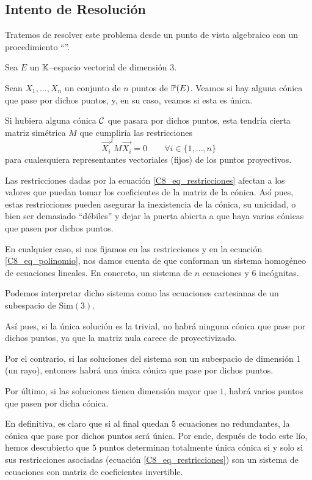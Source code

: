 \subsection{Intento de Resolución}
\label{C8_intento}
Tratemos de resolver este problema desde un punto de vista algebraico con un procedimiento ``''.

Sea $E$ un $\mathbb{K}$--espacio vectorial de dimensión $3$.

Sean $X_1,\dots,X_n$ un conjunto de $n$ puntos de $\mathbb{P}(E)$. Veamos si hay alguna cónica que pase por dichos puntos, y, en su caso, veamos si esta es única.

Si hubiera alguna cónica $\mathcal{C}$ que pasara por dichos puntos, esta tendría cierta matriz simétrica $M$ que cumpliría las restricciones
\begin{equation}
\label{C8_eq_restricciones}
	\vec{X_i}^tM\vec{X_i}=0\qquad\forall i\in\{1,\dots,n\}
\end{equation}
para cualesquiera representantes vectoriales (fijos) de los puntos proyectivos.

Las restricciones dadas por la ecuación \eqref{C8_eq_restricciones} afectan a los valores que puedan tomar los coeficientes de la matriz de la cónica. Así pues, estas restricciones pueden asegurar la inexistencia de la cónica, su unicidad, o bien ser demasiado ``débiles'' y dejar la puerta abierta a que haya varias cónicas que pasen por dichos puntos.

En cualquier caso, si nos fijamos en las restricciones y en la ecuación \eqref{C8_eq_polinomio}, nos damos cuenta de que conforman un sistema homogéneo de ecuaciones lineales. En concreto, un sistema de $n$ ecuaciones y $6$ incógnitas.

Podemos interpretar dicho sistema como las ecuaciones cartesianas de un subespacio de $\mathrm{Sim}(3)$.

Así pues, si la única solución es la trivial, no habrá ninguna cónica que pase por dichos puntos, ya que la matriz nula carece de proyectivizado.

Por el contrario, si las soluciones del sistema son un subespacio de dimensión $1$ (un rayo), entonces habrá una única cónica que pase por dichos puntos.

Por último, si las soluciones tienen dimensión mayor que $1$, habrá varios puntos que pasen por dicha cónica.

En definitiva, es claro que si al final quedan $5$ ecuaciones no redundantes, la cónica que pase por dichos puntos será única. Por ende, después de todo este lío, hemos descubierto que $5$ puntos determinan totalmente única cónica si y solo si sus restricciones asociadas (ecuación \eqref{C8_eq_restricciones}) son un sistema de ecuaciones con matriz de coeficientes invertible.

